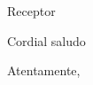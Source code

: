 \documentclass[letterpaper,spanish,11pt]{letter}
\begin{document}
\begin{letter}{Receptor}
	
\opening{Cordial saludo}

\closing{Atentamente,}


\end{letter}
\end{document}
